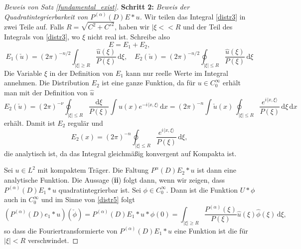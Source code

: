 \begin{proof}[Beweis von Satz \ref{fundamental_exist}]
\textbf{Schritt 2:} \emph{Beweis der Quadratintegrierbarkeit von $P^{(\alpha)}(D) E * u$.}
Wir teilen das Integral \eqref{distr3} in zwei Teile auf. Falls $R=\sqrt{C^2 + C'^2}$, haben wir $|\xi<<R$ und der Teil des Integrals von \eqref{distr3}, wo $\xi$ nicht real ist. Schreibe also 
\begin{equation}\label{distr4}
E=E_1 + E_2,
\end{equation}
\begin{equation}\label{distr5}
E_1(\check u) = (2\pi)^{-n/2} \int_{|\xi|\ge R} \frac{\hat u(\xi)}{P(\xi)}\, \mathrm d\xi, \quad E_2(\check u)= (2\pi)^{-n/2} \oint_{|\xi|\le R} \frac{\hat u(\xi)}{P(\xi)}\, \mathrm d\xi
\end{equation}
Die Variable $\xi$ in der Definition von $E_1$ kann nur reelle Werte im Integral annehmen. Die Distribution $E_2$ ist eine ganze Funktion, da für $u\in C_0^\infty$ erhält man mit der Definition von $\hat u$
\begin{equation}
E_2(\check u) = (2\pi)^{-\nu} \oint_{|\xi |\le R} \frac{\mathrm d\xi}{P(\xi)} \int u(x) e^{-i\langle x,\xi\rangle}\, \mathrm dx= (2\pi)^{-n} \int \check u(x) \, \oint_{|\xi|\le R} \frac{e^{i\langle x, \xi\rangle}}{P(\xi)}\, \mathrm d\xi \, \mathrm dx
\end{equation}
erhält. Damit ist $E_2$ regulär und
\begin{equation}
E_2(x) = (2\pi)^{-n} \oint_{|\xi|\le R} \frac{e^{i\langle x, \xi\rangle}}{P(\xi)}\, \mathrm d\xi,
\end{equation}
die analytisch ist, da das Integral gleichmäßig konvergent auf Kompakta ist. 

Sei $u\in L^2$ mit kompaktem Träger. Die Faltung $P^{\alpha}(D)E_2 *u$ ist dann eine analytische Funktion.  Die Aussage ({\bf ii}) folgt dann, wenn wir zeigen, dass $P^{(\alpha)}(D) E_1 * u$ quadratintegrierbar ist.  Sei $\phi \in C_0^\infty$. Dann ist die Funktion $U*\phi$ auch in $C_0^\infty$ und im Sinne von \eqref{distr5} folgt
\begin{equation}
(P^{(\alpha)} (D) e_1 * u) (\check \phi) = P^{(\alpha)}(D) E_1 * u * \phi(0) = \int_{|\xi| \ge R} \frac{P^{(\alpha)}(\xi)}{P(\xi)} \hat u(\xi) \hat \phi(\xi) \, \mathrm d\xi,
\end{equation}     
so dass die Fouriertransformierte von $P^{(\alpha)}(D) E_1 * u$ eine Funktion ist die für $|\xi|<R$ verschwindet. 
\end{proof}
